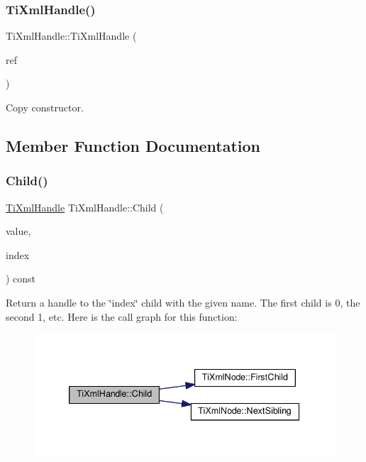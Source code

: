 \subsubsection{\texorpdfstring{Ti\+Xml\+Handle()}{TiXmlHandle()}\hspace{0.1cm}{\footnotesize\ttfamily [2/2]}}
{\footnotesize\ttfamily Ti\+Xml\+Handle\+::\+Ti\+Xml\+Handle (\begin{DoxyParamCaption}\item[{const \hyperlink{class_ti_xml_handle}{Ti\+Xml\+Handle} \&}]{ref }\end{DoxyParamCaption})\hspace{0.3cm}{\ttfamily [inline]}}



Copy constructor. 



\subsection{Member Function Documentation}
\mbox{\label{class_ti_xml_handle_a9903b035444ee36450fe00ede403f920}} 
\subsubsection{\texorpdfstring{Child()}{Child()}\hspace{0.1cm}{\footnotesize\ttfamily [1/2]}}
{\footnotesize\ttfamily \hyperlink{class_ti_xml_handle}{Ti\+Xml\+Handle} Ti\+Xml\+Handle\+::\+Child (\begin{DoxyParamCaption}\item[{const char $\ast$}]{value,  }\item[{int}]{index }\end{DoxyParamCaption}) const}

Return a handle to the \char`\"{}index\char`\"{} child with the given name. The first child is 0, the second 1, etc. Here is the call graph for this function\+:
\nopagebreak
\begin{figure}[H]
\begin{center}
\leavevmode
\includegraphics[width=339pt]{class_ti_xml_handle_a9903b035444ee36450fe00ede403f920_cgraph}
\end{center}
\end{figure}
\mbox{\label{class_ti_xml_handle_a32585942abb28e03eea9c5223f38a659}} 
